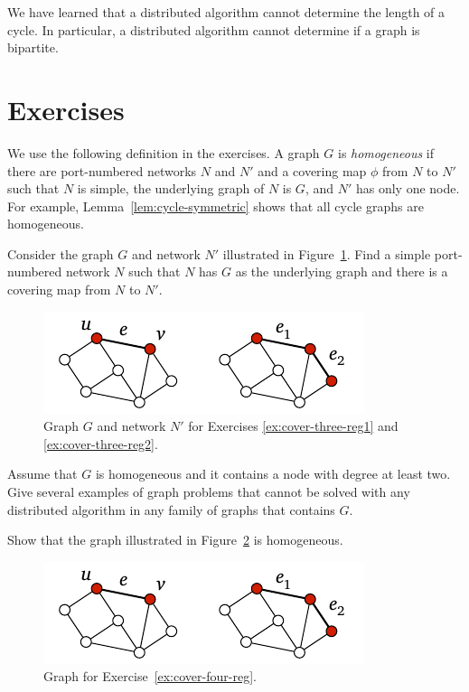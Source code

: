 We have learned that a distributed algorithm cannot determine the length of a cycle. In particular, a distributed algorithm cannot determine if a graph is bipartite.


\section{Exercises}

We use the following definition in the exercises. A graph $G$ is \emph{homogeneous} if there are port-numbered networks $N$ and $N'$ and a covering map $\phi$ from $N$ to $N'$ such that $N$ is simple, the underlying graph of $N$ is $G$, and $N'$ has only one node. For example, Lemma~\ref{lem:cycle-symmetric} shows that all cycle graphs are homogeneous.

\begin{ex}\label{ex:cover-three-reg1}
    Consider the graph $G$ and network $N'$ illustrated in Figure~\ref{fig:cover-ex-three-reg}. Find a simple port-numbered network $N$ such that $N$ has $G$ as the underlying graph and there is a covering map from $N$ to $N'$.

    \begin{figure}
        \centering
        \includegraphics[page=\PCoverExThreeReg]{figs.pdf}
        \caption{Graph $G$ and network $N'$ for Exercises \ref{ex:cover-three-reg1} and \ref{ex:cover-three-reg2}.}\label{fig:cover-ex-three-reg}
    \end{figure}
\end{ex}

\begin{ex}[homogeneity]
    Assume that $G$ is homogeneous and it contains a node with degree at least two. Give several examples of graph problems that cannot be solved with any distributed algorithm in any family of graphs that contains $G$.
\end{ex}

\begin{ex}\label{ex:cover-four-reg}
    Show that the graph illustrated in Figure~\ref{fig:cover-ex-four-reg} is homogeneous.


    \begin{figure}
        \centering
        \includegraphics[page=\PCoverExFourReg]{figs.pdf}
        \caption{Graph for Exercise~\ref{ex:cover-four-reg}.}\label{fig:cover-ex-four-reg}
    \end{figure}
\end{ex}

